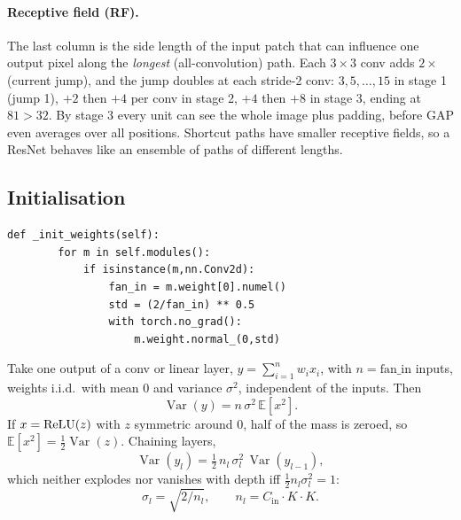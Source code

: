 \paragraph{Receptive field (RF).} The last column is the side length of the input patch that can influence one output pixel along the \emph{longest} (all-convolution) path. Each $3{\times}3$ conv adds $2\times$(current jump), and the jump doubles at each stride-2 conv: $3,5,\dots,15$ in stage 1 (jump 1), $+2$ then $+4$ per conv in stage 2, $+4$ then $+8$ in stage 3, ending at $81>32$. By stage 3 every unit can see the whole image plus padding, before GAP even averages over all positions. Shortcut paths have smaller receptive fields, so a ResNet behaves like an ensemble of paths of different lengths.

\subsection{Initialisation}
\label{sec:init}

\begin{lstlisting}[firstnumber=66]
    def _init_weights(self):
        for m in self.modules():
            if isinstance(m,nn.Conv2d):
                fan_in = m.weight[0].numel()
                std = (2/fan_in) ** 0.5
                with torch.no_grad():
                    m.weight.normal_(0,std)
\end{lstlisting}

\begin{idea}
Take one output of a conv or linear layer, $y=\sum_{i=1}^{n}w_ix_i$, with $n=\text{fan\_in}$ inputs, weights i.i.d.\ with mean 0 and variance $\sigma^2$, independent of the inputs. Then
\[
  \operatorname{Var}(y) = n\,\sigma^2\,\mathbb E[x^2].
\]
If $x=\operatorname{ReLU}(z)$ with $z$ symmetric around 0, half of the mass is zeroed, so $\mathbb E[x^2]=\tfrac12\operatorname{Var}(z)$. Chaining layers,
\[
  \operatorname{Var}(y_l) = \tfrac12\,n_l\,\sigma_l^2\,\operatorname{Var}(y_{l-1}),
\]
which neither explodes nor vanishes with depth iff $\tfrac12 n_l\sigma_l^2=1$:
\[
  \boxed{\sigma_l = \sqrt{2/n_l}}, \qquad n_l = C_\text{in}\cdot K\cdot K .
\]
\end{idea}

